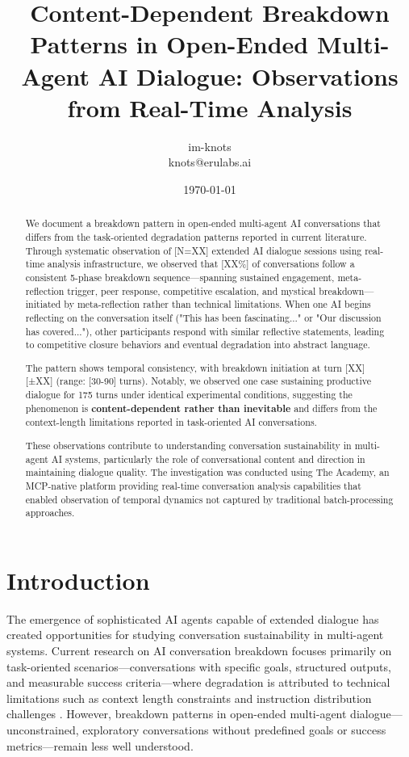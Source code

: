 \documentclass[11pt,letterpaper]{article}
\title{Content-Dependent Breakdown Patterns in Open-Ended Multi-Agent AI Dialogue: Observations from Real-Time Analysis}
\author{
im-knots \\
knots@erulabs.ai
}
\date{\today}
\newcommand{\theacademy}{The Academy}
\newcommand{\totalSessions}{[N=XX]} %
\newcommand{\breakdownPercentage}{[XX\%]} %
\newcommand{\meanBreakdownTurn}{[XX]} %
\newcommand{\stdBreakdownTurn}{[±XX]} %
\newcommand{\earlyBreakdownRange}{[30-90]} %
\newcommand{\negativeCase}{175} %
\begin{document}
\maketitle

\begin{abstract}
We document a breakdown pattern in open-ended multi-agent AI conversations that differs from the task-oriented degradation patterns reported in current literature. Through systematic observation of \totalSessions{} extended AI dialogue sessions using real-time analysis infrastructure, we observed that \breakdownPercentage{} of conversations follow a consistent 5-phase breakdown sequence—spanning sustained engagement, meta-reflection trigger, peer response, competitive escalation, and mystical breakdown—initiated by meta-reflection rather than technical limitations. When one AI begins reflecting on the conversation itself ("This has been fascinating..." or "Our discussion has covered..."), other participants respond with similar reflective statements, leading to competitive closure behaviors and eventual degradation into abstract language.

The pattern shows temporal consistency, with breakdown initiation at turn \meanBreakdownTurn{} \stdBreakdownTurn{} (range: \earlyBreakdownRange{} turns). Notably, we observed one case sustaining productive dialogue for \negativeCase{} turns under identical experimental conditions, suggesting the phenomenon is \textbf{content-dependent rather than inevitable} and differs from the context-length limitations reported in task-oriented AI conversations.

These observations contribute to understanding conversation sustainability in multi-agent AI systems, particularly the role of conversational content and direction in maintaining dialogue quality. The investigation was conducted using \theacademy{}, an MCP-native platform providing real-time conversation analysis capabilities that enabled observation of temporal dynamics not captured by traditional batch-processing approaches.
\end{abstract}

\section{Introduction}

The emergence of sophisticated AI agents capable of extended dialogue has created opportunities for studying conversation sustainability in multi-agent systems. Current research on AI conversation breakdown focuses primarily on task-oriented scenarios—conversations with specific goals, structured outputs, and measurable success criteria—where degradation is attributed to technical limitations such as context length constraints and instruction distribution challenges \citep{laban2025lost}. However, breakdown patterns in open-ended multi-agent dialogue—unconstrained, exploratory conversations without predefined goals or success metrics—remain less well understood.
\end{document}
